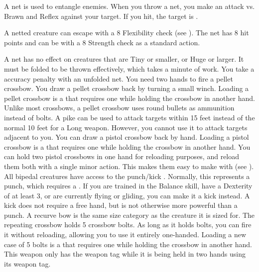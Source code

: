      A net is used to entangle enemies. When you throw a net, you make an attack vs. Brawn and Reflex against your target. If you hit, the target is \slowed.
    \par A netted creature can escape with a  8 Flexibility check (see ). The net has 8 hit points and can be  with a  8 Strength check as a standard action.
    \par A net has no effect on creatures that are Tiny or smaller, or Huge or larger. It must be folded to be thrown effectively, which takes a minute of work. You take a  accuracy penalty with an unfolded net.
     You need two hands to fire a pellet crossbow.
    You draw a pellet crossbow back by turning a small winch.
    Loading a pellet crossbow is a  that requires one  while holding the crossbow in another hand.
    Unlike most crossbows, a pellet crossbow uses round bullets as ammunition instead of bolts.
     A pike can be used to attack targets within 15 feet instead of the normal 10 feet for a Long weapon.
    However, you cannot use it to attack targets adjacent to you.
     You can draw a pistol crossbow back by hand.
    Loading a pistol crossbow is a  that requires one  while holding the crossbow in another hand.
    You can hold two pistol crossbows in one hand for reloading purposes, and reload them both with a single minor action.
    This makes them easy to make  with (see ).
     All bipedal creatures have access to the punch/kick .
    Normally, this represents a punch, which requires a .
    If you are trained in the Balance skill, have a Dexterity of at least 3, or are currently flying or gliding, you can make it a kick instead.
    A kick does not require a free hand, but is not otherwise more powerful than a punch.
     A recurve bow is the same size category as the creature it is sized for.
     The repeating crossbow holds 5 crossbow bolts.
    As long as it holds bolts, you can fire it without reloading, allowing you to use it entirely one-handed.
    Loading a new case of 5 bolts is a  that requires one  while holding the crossbow in another hand.
     This weapon only has the  weapon tag while it is being held in two hands using its  weapon tag.
